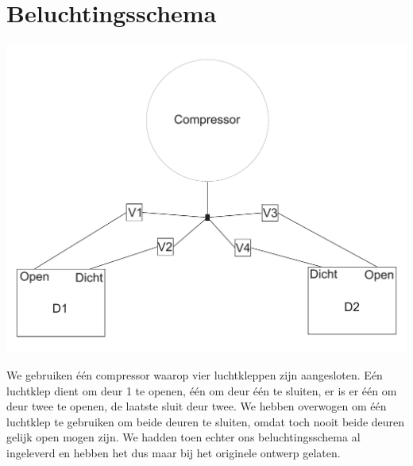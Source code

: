 \section{Beluchtingsschema}


    \begin{center}
    \includegraphics[scale=.5]{beluchting}
    \end{center}

    We gebruiken \'{e}\'{e}n compressor waarop vier luchtkleppen zijn
    aangesloten. E\'{e}n luchtklep dient om deur 1 te openen,
    \'{e}\'{e}n om deur \'{e}\'{e}n te sluiten, er is er \'{e}\'{e}n om deur twee
    te openen, de laatste sluit deur twee. We hebben overwogen om
    \'{e}\'{e}n luchtklep te gebruiken om beide deuren te sluiten,
    omdat toch nooit beide deuren gelijk open mogen zijn. We hadden
    toen echter ons beluchtingsschema al ingeleverd en hebben het
    dus maar bij het originele ontwerp gelaten.
